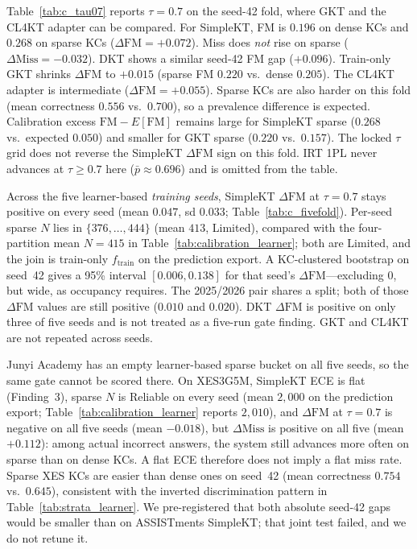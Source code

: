 Table~\ref{tab:c_tau07} reports $\tau=0.7$ on the seed-42 fold, where GKT and the CL4KT adapter can be compared. For SimpleKT, FM is $0.196$ on dense KCs and $0.268$ on sparse KCs ($\Delta\mathrm{FM}=+0.072$). Miss does \emph{not} rise on sparse ($\Delta\mathrm{Miss}=-0.032$). DKT shows a similar seed-42 FM gap ($+0.096$). Train-only GKT shrinks $\Delta\mathrm{FM}$ to $+0.015$ (sparse FM $0.220$ vs.\ dense $0.205$). The CL4KT adapter is intermediate ($\Delta\mathrm{FM}=+0.055$). Sparse KCs are also harder on this fold (mean correctness $0.556$ vs.\ $0.700$), so a prevalence difference is expected. Calibration excess $\mathrm{FM}-E[\mathrm{FM}]$ remains large for SimpleKT sparse ($0.268$ vs.\ expected $0.050$) and smaller for GKT sparse ($0.220$ vs.\ $0.157$). The locked $\tau$ grid does not reverse the SimpleKT $\Delta\mathrm{FM}$ sign on this fold. IRT 1PL never advances at $\tau\ge 0.7$ here ($\bar p\approx 0.696$) and is omitted from the table.

Across the five learner-based \emph{training seeds}, SimpleKT $\Delta\mathrm{FM}$ at $\tau=0.7$ stays positive on every seed (mean $0.047$, sd $0.033$; Table~\ref{tab:c_fivefold}). Per-seed sparse $N$ lies in $\{376,\ldots,444\}$ (mean $413$, Limited), compared with the four-partition mean $N=415$ in Table~\ref{tab:calibration_learner}; both are Limited, and the join is train-only $f_{\mathrm{train}}$ on the prediction export. A KC-clustered bootstrap on seed~42 gives a 95\% interval $[0.006, 0.138]$ for that seed's $\Delta\mathrm{FM}$---excluding 0, but wide, as occupancy requires. The 2025/2026 pair shares a split; both of those $\Delta\mathrm{FM}$ values are still positive ($0.010$ and $0.020$). DKT $\Delta\mathrm{FM}$ is positive on only three of five seeds and is not treated as a five-run gate finding. GKT and CL4KT are not repeated across seeds.

Junyi Academy has an empty learner-based sparse bucket on all five seeds, so the same gate cannot be scored there. On XES3G5M, SimpleKT ECE is flat (Finding~3), sparse $N$ is Reliable on every seed (mean $2{,}000$ on the prediction export; Table~\ref{tab:calibration_learner} reports $2{,}010$), and $\Delta\mathrm{FM}$ at $\tau=0.7$ is negative on all five seeds (mean $-0.018$), but $\Delta\mathrm{Miss}$ is positive on all five (mean $+0.112$): among actual incorrect answers, the system still advances more often on sparse than on dense KCs. A flat ECE therefore does not imply a flat miss rate. Sparse XES KCs are easier than dense ones on seed~42 (mean correctness $0.754$ vs.\ $0.645$), consistent with the inverted discrimination pattern in Table~\ref{tab:strata_learner}. We pre-registered that both absolute seed-42 gaps would be smaller than on ASSISTments SimpleKT; that joint test failed, and we do not retune it.

